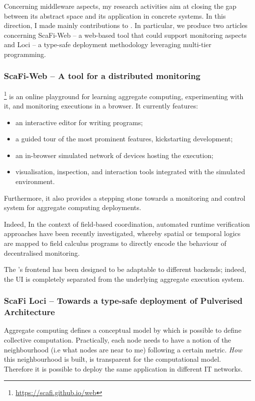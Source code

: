 \documentclass[11pt]{article}
\begin{document}
Concerning middleware aspects, my research activities aim at closing the gap between
its abstract space and its application in concrete systems. In this direction, I made mainly contributions to \scafi. In particular, we produce two articles concerning ScaFi-Web -- a web-based tool that could support monitoring aspects and \scafi Loci -- a type-safe deployment methodology leveraging multi-tier programming.
\subsubsection{ScaFi-Web -- A tool for a distributed monitoring}
\scafiweb{}\footnote{\url{https://scafi.github.io/web}}
 is an online playground for learning aggregate computing, experimenting with it, and monitoring executions in a browser.
It currently features:
\begin{itemize}
 \item an interactive editor for writing \scafi{} programs;
 \item a guided tour of the most prominent features, kickstarting development;
 \item an in-browser simulated network of devices hosting the execution;
 \item visualisation, inspection, and interaction tools integrated with the simulated environment.
\end{itemize}

Furthermore, it also provides a stepping stone towards a monitoring and control system for aggregate computing deployments.

Indeed, In the context of field-based coordination, automated runtime verification approaches have been recently investigated, whereby spatial or temporal logics are mapped to field calculus programs to directly encode the behaviour of decentralised monitoring.

The \scafiweb{}'s frontend has been designed to be adaptable to different backends; indeed, the UI is completely separated from the underlying aggregate execution system. 

\subsubsection{ScaFi Loci -- Towards a type-safe deployment of Pulverised Architecture}
Aggregate computing defines a conceptual model by which is possible to define collective computation. Practically, each node needs to have a notion of the neighbourhood (i.e what nodes are near to me) following a certain metric. \textit{How} this neighbourhood is built, is transparent for the computational model. Therefore it is possible to deploy the same application in different IT networks.
\end{document}
